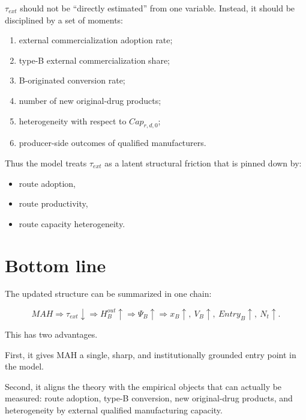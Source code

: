 \documentclass[12pt]{article}
\begin{document}
\(\tau_{ext}\) should not be ``directly estimated'' from one variable.
Instead, it should be disciplined by a set of moments:

\begin{enumerate}[leftmargin=2em]
    \item external commercialization adoption rate;
    \item type-B external commercialization share;
    \item B-originated conversion rate;
    \item number of new original-drug products;
    \item heterogeneity with respect to \(Cap_{r,d,0}\);
    \item producer-side outcomes of qualified manufacturers.
\end{enumerate}

Thus the model treats \(\tau_{ext}\) as a latent structural friction that is pinned down by:
\begin{itemize}[leftmargin=2em]
    \item route adoption,
    \item route productivity,
    \item route capacity heterogeneity.
\end{itemize}

\section{Bottom line}

The updated structure can be summarized in one chain:

\[
MAH
\Rightarrow
\tau_{ext}\downarrow
\Rightarrow
H_B^{out}\uparrow
\Rightarrow
\Psi_B\uparrow
\Rightarrow
x_B\uparrow,\ V_B\uparrow,\ Entry_B\uparrow,\ N_t\uparrow.
\]

This has two advantages.

First, it gives MAH a single, sharp, and institutionally grounded entry point in the model.

Second, it aligns the theory with the empirical objects that can actually be measured:
route adoption, type-B conversion, new original-drug products, and heterogeneity by external
qualified manufacturing capacity.
\end{document}
